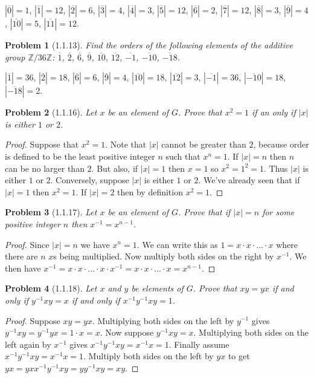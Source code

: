 \documentclass{article}
\newtheorem{problem}{Problem}
\begin{document}
$|\overline{0}| = 1$, $|\overline{1}| = 12$, $|\overline{2}| = 6$, $|\overline{3}| = 4$, $|\overline{4}| = 3$, $|\overline{5}| = 12$, $|\overline{6}| = 2$, $|\overline{7}| = 12$, $|\overline{8}| = 3$, $|\overline{9}| = 4$, $|\overline{10}| = 5$, $|\overline{11}| = 12$.


\begin{problem}[1.1.13]
Find the orders of the following elements of the additive group $\mathbb{Z}/36\mathbb{Z}$: $\overline{1}$, $\overline{2}$, $\overline{6}$, $\overline{9}$, $\overline{10}$, $\overline{12}$, $\overline{-1}$, $\overline{-10}$, $\overline{-18}$.
\end{problem}

$|\overline{1}| = 36$, $|\overline{2}| = 18$, $|\overline{6}| = 6$, $|\overline{9}| = 4$, $|\overline{10}| = 18$, $|\overline{12}| = 3$, $|\overline{-1}| = 36$, $|\overline{-10}| = 18$, $|\overline{-18}| = 2$.

\begin{problem}[1.1.16]
Let $x$ be an element of $G$. Prove that $x^2 = 1$ if an only if $|x|$ is either $1$ or $2$.
\end{problem}
\begin{proof}
Suppose that $x^2 = 1$. Note that $|x|$ cannot be greater than $2$, because order is defined to be the least positive integer $n$ such that $x^n = 1$. If $|x| = n$ then $n$ can be no larger than $2$. But also, if $|x| = 1$ then $x = 1$ so $x^2 = 1^2 = 1$. Thus $|x|$ is either $1$ or $2$. Conversely, suppose $|x|$ is either $1$ or $2$. We've already seen that if $|x| = 1$ then $x^2 = 1$. If $|x| = 2$ then by definition $x^2 = 1$.
\end{proof}

\begin{problem}[1.1.17]
\label{inversepowers}
Let $x$ be an element of $G$. Prove that if $|x| = n$ for some positive integer $n$ then $x^{-1} = x^{n-1}$.
\end{problem}
\begin{proof}
Since $|x| = n$ we have $x^n = 1$. We can write this as $1 = x \cdot x \cdot \dots \cdot x$ where there are $n$ $x$s being multiplied. Now multiply both sides on the right by $x^{-1}$. We then have $x^{-1} = x \cdot x \cdot \dots \cdot x \cdot x^{-1} = x \cdot x \cdot \dots \cdot x = x^{n-1}$.
\end{proof}

\begin{problem}[1.1.18]
Let $x$ and $y$ be elements of $G$. Prove that $xy = yx$ if and only if $y^{-1}xy = x$ if and only if $x^{-1}y^{-1}xy = 1$.
\end{problem}
\begin{proof}
Suppose $xy = yx$. Multiplying both sides on the left by $y^{-1}$ gives $y^{-1}xy = y^{-1}yx = 1 \cdot x = x$. Now suppose $y^{-1}xy = x$. Multiplying both sides on the left again by $x^{-1}$ gives $x^{-1}y^{-1}xy = x^{-1}x = 1$. Finally assume $x^{-1}y^{-1}xy = x^{-1}x = 1$. Multiply both sides on the left by $yx$ to get $yx = yxx^{-1}y^{-1}xy = yy^{-1}xy = xy$.
\end{proof}
\end{document}
